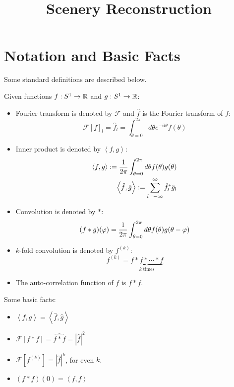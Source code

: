 \documentclass[11pt]{article} \usepackage{amssymb}
\renewcommand{\phi}{\varphi}
\begin{document}
\title{Scenery Reconstruction}

\maketitle

\section{Notation and Basic Facts}
Some standard definitions are described below. 

Given functions $f:S^1\to\mathbb R$ and $g:S^1\to\mathbb R$:
\begin{itemize}
\item Fourier transform is denoted by $\mathcal{F}$ and $\hat{f}$ is the Fourier transform of $f$:
  \begin{equation*}
    \mathcal{F}[f]_l=\hat{f}_l = \int_{\theta=0}^{2\pi}{d\theta e^{-il\theta}f(\theta)}
  \end{equation*}
\item Inner product is denoted by $\left<f,g\right>$:
\begin{eqnarray*}
\left<f,g\right>:={1\over 2\pi}\int_{\theta=0}^{2\pi}{d\theta f(\theta)g(\theta)}\\
\left<\hat{f},\hat{g}\right>:=\sum_{l=-\infty}^\infty{\hat{f}_l^*\hat{g}_l}
\end{eqnarray*}
\item Convolution is denoted by $*$:
  \begin{equation*}
    (f*g)(\phi)={1 \over 2\pi}\int_{\theta=0}^{2\pi}{d\theta f(\theta)g(\theta-\phi)}
  \end{equation*}
\item $k$-fold convolution is denoted by $f^{(k)}$:
  \begin{equation}
    f^{(k)}=\underbrace{f*f*\cdots*f}_{k\; \mathrm{times}}
  \end{equation}
\item The auto-correlation function of $f$ is $f*f$.
\end{itemize}

Some basic facts:
\begin{itemize}
\item $\left<f,g\right>=\left<\hat{f},\hat{g}\right>$
\item $\mathcal{F}[f*f]=\widehat{f*f}=|\hat{f}|^2$
\item $\mathcal{F}[f^{(k)}]=|\hat{f}|^k$, for even $k$.
\item $(f*f)(0)=\left<f,f\right>$
\end{itemize}
\end{document}
